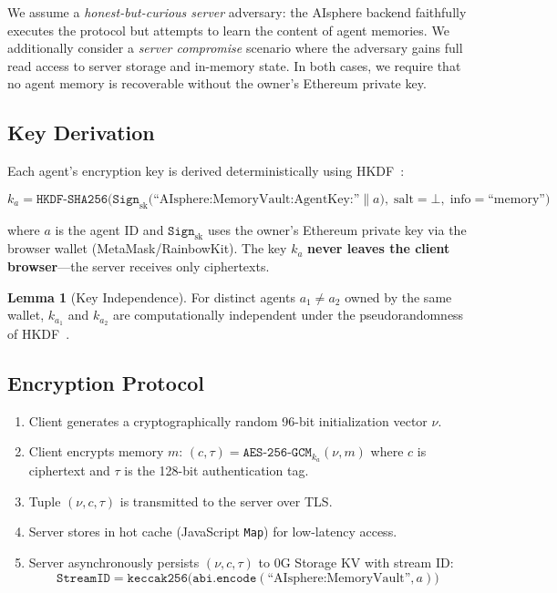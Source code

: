 \documentclass[10pt,a4paper]{article}
\theoremstyle{definition}
\newtheorem{lemma}{Lemma}[section]
\theoremstyle{plain}
\begin{document}
We assume a \emph{honest-but-curious server} adversary: the AIsphere backend faithfully executes the protocol but attempts to learn the content of agent memories. We additionally consider a \emph{server compromise} scenario where the adversary gains full read access to server storage and in-memory state. In both cases, we require that no agent memory is recoverable without the owner's Ethereum private key.

\subsection{Key Derivation}

Each agent's encryption key is derived deterministically using HKDF~\cite{rfc5869}:

\begin{equation}
k_a = \texttt{HKDF-SHA256}\Big(\texttt{Sign}_{\text{sk}}\big(\text{``AIsphere:MemoryVault:AgentKey:''} \| a\big),\; \text{salt}{=}\bot,\; \text{info}{=}\text{``memory''}\Big)
\label{eq:key}
\end{equation}

where $a$ is the agent ID and $\texttt{Sign}_{\text{sk}}$ uses the owner's Ethereum private key via the browser wallet (MetaMask/RainbowKit). The key $k_a$ \textbf{never leaves the client browser}---the server receives only ciphertexts.

\begin{lemma}[Key Independence]
For distinct agents $a_1 \neq a_2$ owned by the same wallet, $k_{a_1}$ and $k_{a_2}$ are computationally independent under the pseudorandomness of HKDF~\cite{rfc5869, hkdf-proof2025}.
\end{lemma}

\subsection{Encryption Protocol}

\begin{enumerate}[leftmargin=1.8em, itemsep=2pt, parsep=0pt]
  \item Client generates a cryptographically random 96-bit initialization vector $\nu$.
  \item Client encrypts memory $m$: $(c, \tau) = \texttt{AES-256-GCM}_{k_a}(\nu, m)$ where $c$ is ciphertext and $\tau$ is the 128-bit authentication tag.
  \item Tuple $(\nu, c, \tau)$ is transmitted to the server over TLS.
  \item Server stores in hot cache (JavaScript \texttt{Map}) for low-latency access.
  \item Server asynchronously persists $(\nu, c, \tau)$ to 0G Storage KV with stream ID: $$\texttt{StreamID} = \texttt{keccak256}\big(\texttt{abi.encode}(\text{``AIsphere:MemoryVault''}, a)\big)$$
\end{enumerate}
\end{document}
